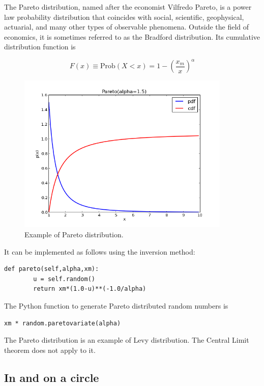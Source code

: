 \documentclass[justified,sixbynine]{tufte-book}
\def\ft{\small\tt}
\theoremstyle{plain}%
\theoremstyle{definition}
\theoremstyle{remark}
\begin{document}
\begin{fullwidth}
The Pareto distribution, named after the economist Vilfredo Pareto, is a power law probability distribution that coincides with social, scientific, geophysical, actuarial, and many other types of observable phenomena. Outside the field of economics, it is sometimes referred to as the Bradford distribution. Its cumulative distribution function is

\begin{equation}
F(x) \equiv  \textrm{Prob}(X<x) = 1 - \left(\frac{x_m}{x}\right)^{\alpha}
\end{equation}

\begin{figure}[ht]
\centering\includegraphics[width=4in]{images/pareto.png}
\caption{Example of Pareto distribution.}
\end{figure}

It can be implemented as follows using the inversion method:

\begin{lstlisting}[caption={in file: {\ft nlib.py}}]
    def pareto(self,alpha,xm):
        u = self.random()
        return xm*(1.0-u)**(-1.0/alpha)
\end{lstlisting}

The Python function to generate Pareto distributed random numbers is

\begin{lstlisting}
xm * random.paretovariate(alpha)
\end{lstlisting}

The Pareto distribution is an example of Levy distribution. The Central Limit theorem does not apply to it.

\goodbreak\subsection{In and on a circle}


\end{fullwidth}
\end{document}

